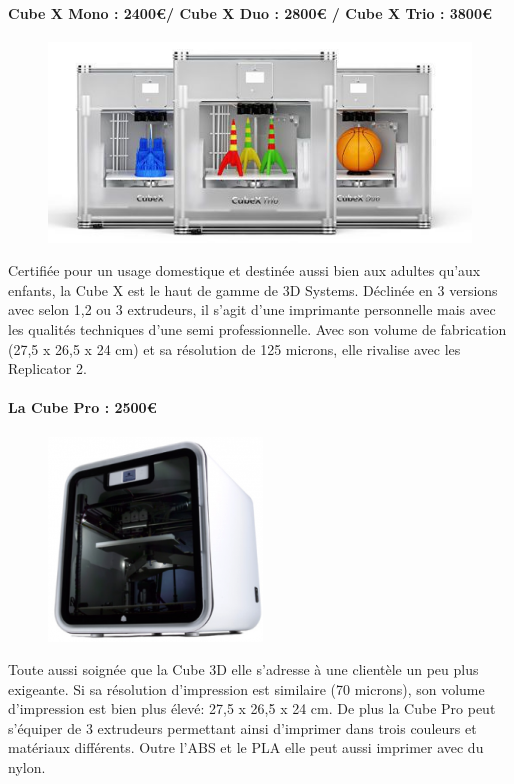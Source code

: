 \documentclass{article}
\begin{document}
\paragraph{Cube X Mono : 2400\euro{}/ Cube X Duo : 2800\euro{} / Cube X Trio : 3800\euro{}} \hfill \break
\begin{figure}[h!]
\centering
\includegraphics[scale=0.4]{./images/cubex1.png}
\end{figure}\hfill \break
Certifiée pour un usage domestique et destinée aussi bien aux adultes qu'aux enfants, la Cube X est le haut de gamme de 3D Systems. Déclinée en 3 versions avec selon 1,2 ou 3 extrudeurs, il s'agit d'une imprimante personnelle mais avec les qualités techniques d'une semi professionnelle. Avec son volume de fabrication (27,5 x 26,5 x 24 cm) et sa résolution de 125 microns, elle rivalise avec les Replicator 2.

\paragraph{La Cube Pro : 2500\euro{}} \hfill \break
\begin{figure}[h!]
\centering
\includegraphics[scale=0.4]{./images/cubepro.png}
\end{figure}\hfill \break
Toute aussi soignée que la Cube 3D elle s'adresse à une clientèle un peu plus exigeante. Si sa résolution d'impression est similaire (70 microns), son volume d'impression est bien plus élevé: 27,5 x 26,5 x 24 cm. De plus la Cube Pro peut s'équiper de 3 extrudeurs permettant ainsi d'imprimer dans trois couleurs et matériaux différents. Outre l'ABS et le PLA elle peut aussi imprimer avec du nylon.
\newpage
\end{document}
